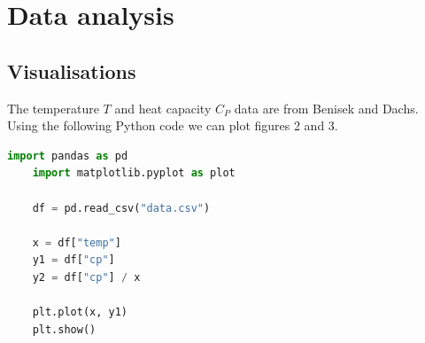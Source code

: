 \documentclass{article}
\begin{document}
\section{Data analysis}

\subsection{Visualisations}
The temperature $T$ and heat capacity $C_P$ data are from Benisek and Dachs.\cite*{benisek}
\\
Using the following Python code we can plot figures 2 and 3.
\begin{lstlisting}[language=Python]
    import pandas as pd
    import matplotlib.pyplot as plot

    df = pd.read_csv("data.csv")

    x = df["temp"]
    y1 = df["cp"]
    y2 = df["cp"] / x

    plt.plot(x, y1)
    plt.show()
\end{lstlisting}
\end{document}
